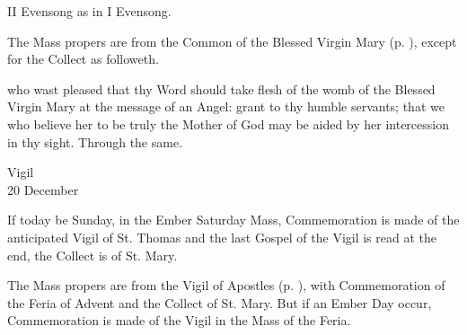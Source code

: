\begin{rubric}
	II Evensong as in I Evensong.
\end{rubric}




\begin{rubric}
	The Mass propers are from the Common of the Blessed Virgin Mary (p. \pageref{CommonBVM}), except for the Collect as followeth.
\end{rubric}

\collect
{} who wast pleased that thy Word should take flesh of the womb of the Blessed Virgin Mary at the message of an Angel: grant to thy humble servants; that we who believe her to be truly the Mother of God may be aided by her intercession in thy sight. Through the same.


\begin{inhead}
    {Vigil\\
20 December}
\end{inhead}

\begin{rubric}
	If today be Sunday, in the Ember Saturday Mass, Commemoration is made of the anticipated Vigil of St. Thomas and the last Gospel of the Vigil is read at the end, the  Collect is of St. Mary.
\end{rubric}

\begin{rubric}
	The Mass propers are from the Vigil of Apostles (p. \pageref{CommonVigilApostles}), with Commemoration of the Feria of Advent and the  Collect of St. Mary. But if an Ember Day occur, Commemoration is made of the Vigil in the Mass of the Feria.
\end{rubric}


